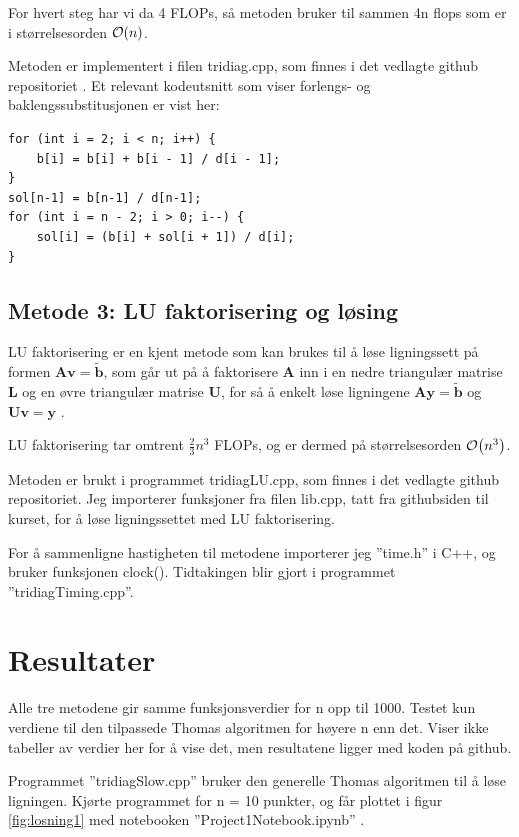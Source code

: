 \documentclass[reprint,english,notitlepage]{revtex4-1}
\begin{document}
	For hvert steg har vi da 4 FLOPs, så metoden bruker til sammen 4n flops som er i størrelsesorden $\order{n}$.
	
	Metoden er implementert i filen tridiag.cpp, som finnes i det vedlagte github repositoriet \cite{myRepo}. Et relevant kodeutsnitt som viser forlengs- og baklengssubstitusjonen er vist her:
	
	\begin{verbatim}
for (int i = 2; i < n; i++) {
    b[i] = b[i] + b[i - 1] / d[i - 1];
}
sol[n-1] = b[n-1] / d[n-1];
for (int i = n - 2; i > 0; i--) {
    sol[i] = (b[i] + sol[i + 1]) / d[i];
}
	\end{verbatim}
	
	
\subsection{Metode 3: LU faktorisering og løsing}
	LU faktorisering er en kjent metode som kan brukes til å løse ligningssett på formen $\mathbf{A}\mathbf{v} = \tilde{\mathbf{b}}$, som går ut på å faktorisere $\mathbf{A}$ inn i en nedre triangulær matrise $\mathbf{L}$ og en øvre triangulær matrise $\mathbf{U}$, for så å enkelt løse ligningene $\mathbf{A}\mathbf{y} = \tilde{\mathbf{b}}$ og $\mathbf{U}\mathbf{v} = \mathbf{y}$ \cite{luwiki}.
	
	LU faktorisering tar omtrent $\frac{2}{3}n^3$ FLOPs, og er dermed på størrelsesorden $\order{n^3}$.
	
	Metoden er brukt i programmet tridiagLU.cpp, som finnes i det vedlagte github repositoriet\cite{myRepo}. Jeg importerer funksjoner fra filen lib.cpp, tatt fra githubsiden til kurset\cite{libRepo}, for å løse ligningssettet med LU faktorisering.
	
	For å sammenligne hastigheten til metodene importerer jeg ''time.h'' i C++, og bruker funksjonen clock(). Tidtakingen blir gjort i programmet ''tridiagTiming.cpp''.

\section{Resultater} %
	Alle tre metodene gir samme funksjonsverdier for n opp til 1000. Testet kun verdiene til den tilpassede Thomas algoritmen for høyere n enn det. Viser ikke tabeller av verdier her for å vise det, men resultatene ligger med koden på github\cite{myRepo}.
	
	Programmet ''tridiagSlow.cpp'' bruker den generelle Thomas algoritmen til å løse ligningen. Kjørte programmet for n = 10 punkter, og får plottet i figur \ref{fig:losning1} med notebooken ''Project1Notebook.ipynb'' \cite{myRepo}.
\end{document}
